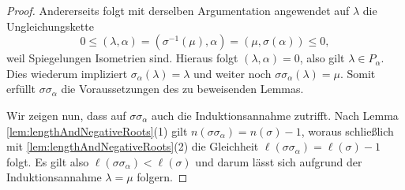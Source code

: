 \begin{proof}
  Andererseits folgt mit derselben Argumentation angewendet auf $\lambda$ die Ungleichungskette
  \begin{displaymath}
    0 \leq (\lambda, \alpha) = (\sigma^{-1}(\mu), \alpha) = (\mu, \sigma(\alpha)) \leq 0,
  \end{displaymath}
  weil Spiegelungen Isometrien sind.
  Hieraus folgt $(\lambda, \alpha) = 0$, also gilt $\lambda \in P_\alpha$.
  Dies wiederum impliziert $\sigma_\alpha(\lambda) = \lambda$ und weiter noch $\sigma \sigma_\alpha(\lambda) = \mu$.
  Somit erfüllt $\sigma \sigma_\alpha$ die Voraussetzungen des zu beweisenden Lemmas. 

  Wir zeigen nun, dass auf $\sigma \sigma_\alpha$ auch die Induktionsannahme zutrifft.
  Nach Lemma \ref{lem:lengthAndNegativeRoots}(1) gilt $n(\sigma\sigma_\alpha) = n(\sigma) - 1$, woraus schließlich mit \ref{lem:lengthAndNegativeRoots}(2) die Gleichheit $\ell(\sigma\sigma_\alpha) = \ell(\sigma) - 1$ folgt.
  Es gilt also $\ell(\sigma\sigma_\alpha) < \ell(\sigma)$ und darum lässt sich aufgrund der Induktionsannahme $\lambda = \mu$ folgern.
\end{proof}
